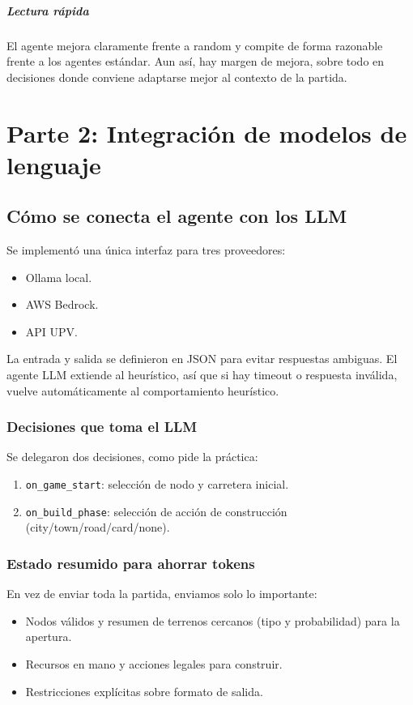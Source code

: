 \documentclass[11pt,spanish,listoffigures,listoftables]{tfgetsinf}
\begin{document}
\paragraph{Lectura rápida}
El agente mejora claramente frente a random y compite de forma razonable frente a los agentes estándar. Aun así, hay margen de mejora, sobre todo en decisiones donde conviene adaptarse mejor al contexto de la partida.

\chapter{Parte 2: Integración de modelos de lenguaje}

\section{Cómo se conecta el agente con los LLM}
Se implementó una única interfaz para tres proveedores:
\begin{itemize}
  \item Ollama local.
  \item AWS Bedrock.
  \item API UPV.
\end{itemize}

La entrada y salida se definieron en JSON para evitar respuestas ambiguas. El agente LLM extiende al heurístico, así que si hay timeout o respuesta inválida, vuelve automáticamente al comportamiento heurístico.

\subsection{Decisiones que toma el LLM}
Se delegaron dos decisiones, como pide la práctica:
\begin{enumerate}
  \item \texttt{on\_game\_start}: selección de nodo y carretera inicial.
  \item \texttt{on\_build\_phase}: selección de acción de construcción (city/town/road/card/none).
\end{enumerate}

\subsection{Estado resumido para ahorrar tokens}
En vez de enviar toda la partida, enviamos solo lo importante:
\begin{itemize}
  \item Nodos válidos y resumen de terrenos cercanos (tipo y probabilidad) para la apertura.
  \item Recursos en mano y acciones legales para construir.
  \item Restricciones explícitas sobre formato de salida.
\end{itemize}
\end{document}
